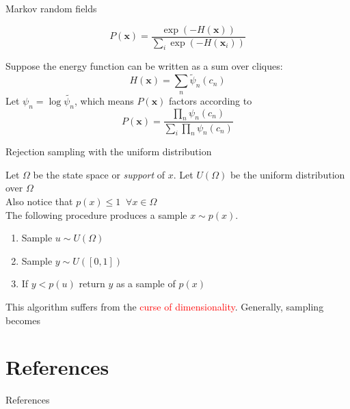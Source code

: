 \documentclass{beamer}					%
\begin{document}
\begin{frame}{Markov random fields}

\begin{equation*}
P(\mathbf{x}) = \frac{\exp\left(-H(\mathbf{x})\right)}{\sum_{i} \exp\left(-H(\mathbf{x}_{i})\right)}
\end{equation*}

Suppose the energy function can be written as a sum over cliques: 
\begin{equation*}
H(\mathbf{x}) = \sum_{n} \tilde{\psi}_{n}(c_{n})
\end{equation*}
Let $\psi_{n} = \log \tilde{\psi_{n}}$, which means $P(\mathbf{x})$ factors according to 
\begin{equation*}
P(\mathbf{x}) = \frac{\prod_{n} \psi_{n}(c_{n})}{\sum_{i} \prod_{n} \psi_{n}(c_{n})}
\end{equation*}


\end{frame}


\begin{frame}{Rejection sampling with the uniform distribution}

Let $\Omega$ be the state space or \emph{support} of $x$. Let $U(\Omega)$ be the uniform distribution over $\Omega$\\
\vspace{0.1in}
Also notice that $p(x) \leq 1 \;\;\forall x \in \Omega$\\
\vspace{0.1in}
The following procedure produces a sample $x\sim p(x)$.
\begin{enumerate}
\item Sample $u\sim U(\Omega)$
\item Sample $y\sim U([0,1])$
\item If $y < p(u)$ return $y$ as a sample of $p(x)$
\end{enumerate}
\vspace{0.2in}
This algorithm suffers from the \textcolor{red}{curse of dimensionality}. Generally, sampling becomes 
\end{frame}


\section{References}

\begin{frame}[allowframebreaks]{References}
	\tiny
	
\end{frame}
\end{document}
